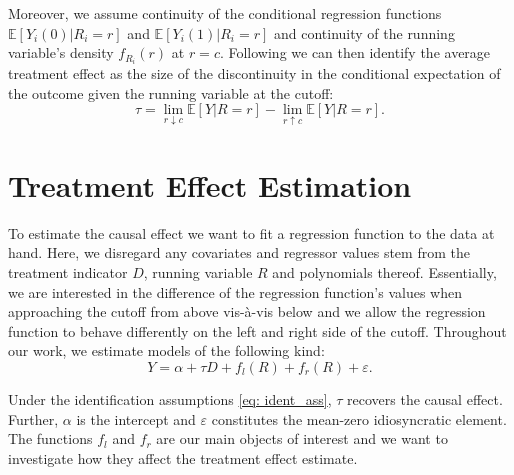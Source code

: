 \documentclass[11pt, a4paper, leqno]{article}
\numberwithin{equation}{section}
\numberwithin{figure}{section}
\numberwithin{table}{section}
\numberwithin{algorithm}{section}
\begin{document}
Moreover, we assume continuity of the conditional regression functions $\mathbb{E}\left[Y_{i}(0) \vert R_{i} = r\right]$ and  $\mathbb{E}\left[Y_{i}(1) \vert R_{i} = r\right]$ and continuity of the running variable's density $f_{R_{i}}(r)$ at $r=c$. Following \cite{hahn_et_al} we can then identify the average treatment effect as the size of the discontinuity in the conditional expectation of the outcome given the running variable at the cutoff:
\begin{equation}
\tau = \lim_{r \downarrow c} \mathbb{E}\left[Y \vert R = r\right] - \lim_{r \uparrow c} \mathbb{E}\left[ Y \vert R = r\right].
\label{eq: ident_ass}
\end{equation}



\section{Treatment Effect Estimation} %
\label{sec: estim}

To estimate the causal effect we want to fit a regression function to the data at hand. Here, we disregard any covariates and regressor values stem from the treatment indicator $D$, running variable $R$ and polynomials thereof. Essentially, we are interested in the difference of the regression function's values when approaching the cutoff from above vis-à-vis below and we allow the regression function to behave differently on the left and right side of the cutoff. Throughout our work, we estimate models of the following kind:
\begin{equation}
Y = \alpha + \tau D + f_{l}(R) + f_{r}(R) + \varepsilon .
\label{eq: model_general}
\end{equation}

Under the identification assumptions \ref{eq: ident_ass}, $\tau$ recovers the causal effect. Further, $\alpha$ is the intercept and $\varepsilon$ constitutes the mean-zero idiosyncratic element. The functions $f_{l}$ and $f_{r}$ are our main objects of interest and we want to investigate how they affect the treatment effect estimate.
\end{document}
